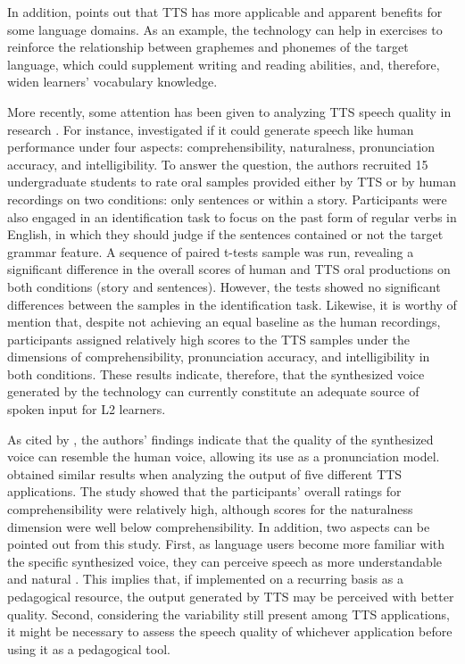 \documentclass[english]{textolivre}
\begin{document}
In addition, \textcite{handley_text--speech_2013} points out that TTS has more applicable and apparent benefits for some language domains. As an example, the technology can help in exercises to reinforce the relationship between graphemes and phonemes of the target language, which could supplement writing and reading abilities, and, therefore, widen learners’ vocabulary knowledge.

More recently, some attention has been given to analyzing TTS speech quality in research \cite{liakin_mobilizing_2017}. For instance, \textcite{cardoso_evaluating_2015} investigated if it could generate speech like human performance under four aspects: comprehensibility, naturalness, pronunciation accuracy, and intelligibility. To answer the question, the authors recruited 15 undergraduate students to rate oral samples provided either by TTS or by human recordings on two conditions: only sentences or within a story. Participants were also engaged in an identification task to focus on the past form of regular verbs in English, in which they should judge if the sentences contained or not the target grammar feature. A sequence of paired t-tests sample was run, revealing a significant difference in the overall scores of human and TTS oral productions on both conditions (story and sentences). However, the tests showed no significant differences between the samples in the identification task. Likewise, it is worthy of mention that, despite not achieving an equal baseline as the human recordings, participants assigned relatively high scores to the TTS samples under the dimensions of comprehensibility, pronunciation accuracy, and intelligibility in both conditions. These results indicate, therefore, that the synthesized voice generated by the technology can currently constitute an adequate source of spoken input for L2 learners.

As cited by \textcite{liakin_mobilizing_2017}, the authors' findings indicate that the quality of the synthesized voice can resemble the human voice, allowing its use as a pronunciation model. \textcite{grimshaw_2018} obtained similar results when analyzing the output of five different TTS applications. The study showed that the participants' overall ratings for comprehensibility were relatively high, although scores for the naturalness dimension were well below comprehensibility. In addition, two aspects can be pointed out from this study. First, as language users become more familiar with the specific synthesized voice, they can perceive speech as more understandable and natural . This implies that, if implemented on a recurring basis as a pedagogical resource, the output generated by TTS may be perceived with better quality. Second, considering the variability still present among TTS applications, it might be necessary to assess the speech quality of whichever application before using it as a pedagogical tool.
\end{document}
